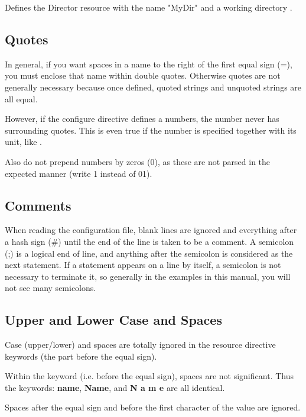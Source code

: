 Defines the Director resource with the name "MyDir" and a working directory
.
\hide{$}

\subsection{Quotes}
\label{sec:Quotes}
In general, if you want spaces in a name to the
right of the first equal sign (=), you must enclose that name within double
quotes. Otherwise quotes are not generally necessary because once defined,
quoted strings and unquoted strings are all equal.

However, if the configure directive defines a numbers, the number never has surrounding quotes.
This is even true if the number is specified together with its unit, like .

Also do not prepend numbers by zeros (0), as these are not parsed in the expected manner (write 1 instead of 01).

\subsection{Comments}
\label{Comments}

When reading the configuration file, blank lines are ignored and everything
after a hash sign (\#) until the end of the line is taken to be a comment. A
semicolon (;) is a logical end of line, and anything after the semicolon is
considered as the next statement. If a statement appears on a line by itself,
a semicolon is not necessary to terminate it, so generally in the examples in
this manual, you will not see many semicolons.


\subsection{Upper and Lower Case and Spaces}

Case (upper/lower) and spaces are totally ignored in the resource directive
keywords (the part before the equal sign).

Within the keyword (i.e. before the equal sign), spaces are not significant.
Thus the keywords: {\bf name}, {\bf Name}, and {\bf N a m e} are all
identical.

Spaces after the equal sign and before the first character of the value are
ignored.

